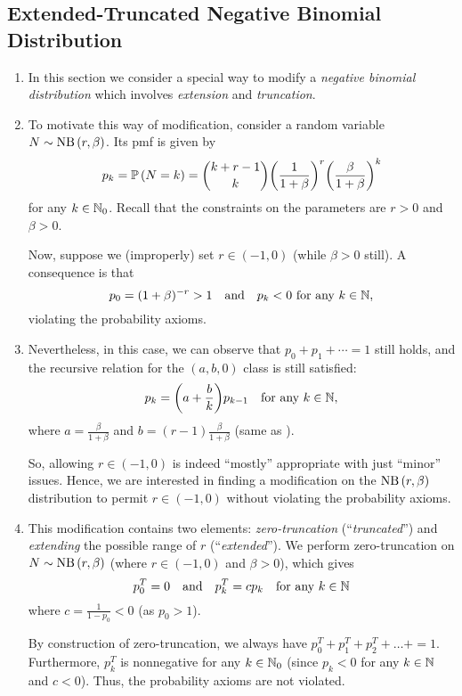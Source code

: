 \subsection{Extended-Truncated Negative Binomial Distribution}
\begin{enumerate}
\item In this section we consider a special way to modify a \emph{negative
binomial distribution} which involves \emph{extension} and \emph{truncation}.

\item To motivate this way of modification, consider a random variable
\(N\sim\operatorname{NB}\left(r,\beta\right)\). Its pmf is given by
\[
p_k=\mathbb{P}\left(N=k\right)=\binom{k+r-1}{k}\qty(\frac{1}{1+\beta})^{r}\qty(\frac{\beta}{1+\beta})^{k}
\]
for any \(k\in\mathbb{N}_0\). Recall that the constraints on the parameters are \(r>0\)
and \(\beta>0\).

Now, suppose we (improperly) set \(r\in(-1,0)\) (while \(\beta>0\) still). A
consequence is that
\[
p_0=(1+\beta)^{-r}>1\qqtext{and}p_k<0\text{ for any \(k\in\N\)},
\]
violating the probability axioms.

\item Nevertheless, in this case, we can observe that \(p_0+p_1+\dotsb=1\)
still holds, and the recursive relation for the \((a,b,0)\) class is still
satisfied:
\[
p_k=\qty(a+\frac{b}{k})p_{k-1}\quad\text{for any \(k\in\mathbb{N}\)},
\]
where \(\displaystyle a=\frac{\beta}{1+\beta}\) and \(\displaystyle
b=(r-1)\frac{\beta}{1+\beta}\) (same as ). 

So, allowing \(r\in(-1,0)\) is indeed ``mostly'' appropriate with just
``minor'' issues. Hence, we are interested in finding a modification on the
\(\operatorname{NB}\left(r,\beta\right)\) distribution to permit \(r\in(-1,0)\) without violating the
probability axioms.

\item This modification contains two elements: \emph{zero-truncation}
(``\emph{truncated}'') and \emph{extending} the possible range of \(r\)
(``\emph{extended}''). We perform zero-truncation on \(N\sim\operatorname{NB}\left(r,\beta\right)\)
(where \(r\in(-1,0)\) and \(\beta>0\)), which gives
\[
p_0^T=0\qqtext{and}p_k^T=cp_k\quad\text{for any \(k\in\N\)}
\]
where \(\displaystyle c=\frac{1}{1-p_0}<0\) (as \(p_0>1\)).

\begin{note}
By construction of zero-truncation, we always have
\(p_0^T+p_1^T+p_2^T+\dots+=1\). Furthermore, \(p_k^T\) is nonnegative for any
\(k\in\mathbb{N}_0\) (since \(p_k<0\) for any \(k\in\mathbb{N}\) and \(c<0\)). Thus, the
probability axioms are not violated.
\end{note}


\end{enumerate}
